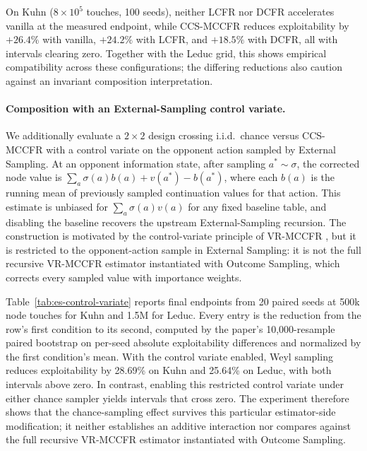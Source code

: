 \documentclass[11pt]{article}
\begin{document}
On Kuhn ($8\!\times\!10^5$ touches, 100 seeds), neither LCFR nor DCFR accelerates vanilla at the measured endpoint, while CCS-MCCFR reduces exploitability by $+26.4\%$ with vanilla, $+24.2\%$ with LCFR, and $+18.5\%$ with DCFR, all with intervals clearing zero. Together with the Leduc grid, this shows empirical compatibility across these configurations; the differing reductions also caution against an invariant composition interpretation.

\paragraph{Composition with an External-Sampling control variate.}
\label{app:es-control-variate}

We additionally evaluate a $2\times2$ design crossing i.i.d.\ chance versus CCS-MCCFR with a control variate on the opponent action sampled by External Sampling. At an opponent information state, after sampling $a^*\sim\sigma$, the corrected node value is $\sum_a\sigma(a)b(a)+v(a^*)-b(a^*)$, where each $b(a)$ is the running mean of previously sampled continuation values for that action. This estimate is unbiased for $\sum_a\sigma(a)v(a)$ for any fixed baseline table, and disabling the baseline recovers the upstream External-Sampling recursion. The construction is motivated by the control-variate principle of VR-MCCFR \citep{schmid2019variance}, but it is restricted to the opponent-action sample in External Sampling: it is not the full recursive VR-MCCFR estimator instantiated with Outcome Sampling, which corrects every sampled value with importance weights.

Table~\ref{tab:es-control-variate} reports final endpoints from 20 paired seeds at 500k node touches for Kuhn and 1.5M for Leduc. Every entry is the reduction from the row's first condition to its second, computed by the paper's 10{,}000-resample paired bootstrap on per-seed absolute exploitability differences and normalized by the first condition's mean. With the control variate enabled, Weyl sampling reduces exploitability by 28.69\% on Kuhn and 25.64\% on Leduc, with both intervals above zero. In contrast, enabling this restricted control variate under either chance sampler yields intervals that cross zero. The experiment therefore shows that the chance-sampling effect survives this particular estimator-side modification; it neither establishes an additive interaction nor compares against the full recursive VR-MCCFR estimator instantiated with Outcome Sampling.
\end{document}
